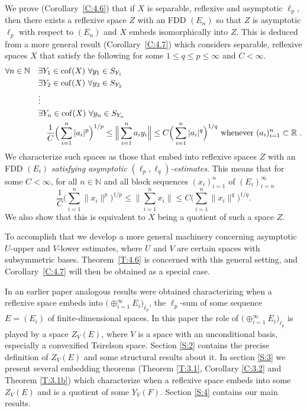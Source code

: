 \documentclass[11pt,leqno]{amsart}
\theoremstyle{definition}
\newcommand{\N}{\mathbb{N}}
\newcommand{\R}{\mathbb{R}}
\newcommand{\cof}{{\rm cof}}
\begin{document}
We prove (Corollary~\ref{C:4.6}) that if $X$ is separable, reflexive
and asymptotic $\ell_p$, then there exists a reflexive space  $Z$
with an FDD $(E_n)$ so that $Z$ is asymptotic $\ell_p$ with respect
to $(E_n)$ and $X$ embeds isomorphically into $Z$.  This is deduced
from a more general result (Corollary~\ref{C:4.7}) which considers
separable, reflexive spaces $X$ that satisfy the following for some
$1\le q\le p \le\infty$ and $C<\infty$.
\begin{align}\label{E:1.2} 
  \forall n\in\N\quad&\exists Y_1\in \cof(X)\ \forall y_1\in S_{Y_1} \\
  &\exists Y_2\in \cof(X)\ \forall y_2\in S_{Y_2} \notag \\
  &\vdots \notag\\
  &\exists Y_n\in \cof(X)\ \forall y_n\in S_{Y_n} \notag\\
  &\quad
  \frac1C \Big(\sum_{i=1}^n |a_i|^p\Big)^{1/p}\le
  \Big\|\sum_{i=1}^n a_i y_i\Big\|
  \le C \Big(\sum_{i=1}^n |a_i|^q\Big)^{1/q}
  \text{ whenever }(a_i)_{i=1}^n\subset\R\ .\notag
\end{align}
We characterize such spaces as those that embed into reflexive spaces
$Z$ with an FDD $(E_i)$ {\em satisfying asymptotic
  $(\ell_p,\ell_q)$-estimates}. This means that for some $C<\infty$,
for all $n\in\N$ and all block sequences $(x_i)_{i=1}^n$ of
$(E_i)_{i=n}^\infty$ $$ \frac1C\Big(\sum_{i=1}^n
\|x_i\|^p\Big)^{1/p}\le\Big\|\sum_{i=1}^n x_i\Big\|\le
C\Big(\sum_{i=1}^n \|x_i\|^q\Big)^{1/q}.$$ We also show that this is
equivalent to $X$ being a quotient of such a space $Z$.

To accomplish that we develop a more general machinery concerning
asymptotic $U$-upper and $V$-lower estimates, where $U$ and $V$ are
certain spaces with subsymmetric bases. Theorem~\ref{T:4.6} is
concerned with this general setting, and Corollary~\ref{C:4.7} will
then be obtained as a special case.

In an earlier paper \cite{OS1} analogous  results were obtained
characterizing when a reflexive space embeds into
$\big(\oplus_{i=1}^\infty E_i\big)_{\ell_p}$, the $\ell_p$-sum of some
sequence $E=(E_i)$ of finite-dimensional spaces. In this paper the
role of $\big(\oplus_{i=1}^\infty E_i\big)_{\ell_p}$ is played by a
space $Z_V(E)$, where $V$ is a space with an unconditional basis,
especially a convexified Tsirelson space. Section \ref{S:2} contains
the precise definition of $Z_V(E)$ and some structural results about
it. In  section \ref{S:3} we present several   embedding theorems
(Theorem \ref{T:3.1}, Corollary \ref{C:3.2} and Theorem \ref{T:3.1b})
which characterize when a reflexive space embeds into some $Z_V(E)$
and is a quotient of some $Y_V(F)$. Section \ref{S:4} contains our
main results.
\end{document}

